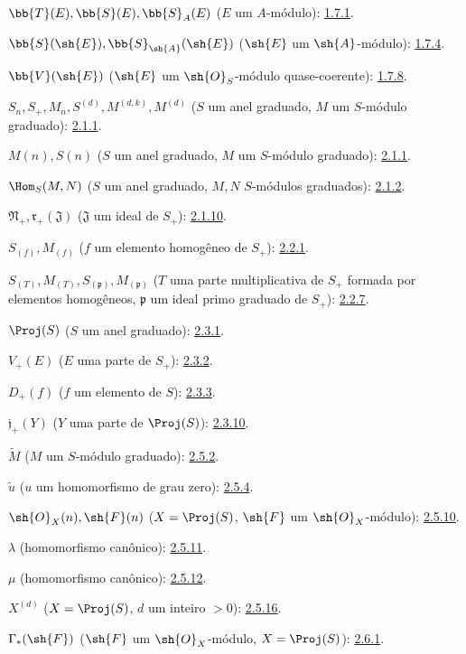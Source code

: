 \documentclass[oneside,10pt]{amsart}
\begin{document}
$\bb{T}(E),\bb{S}(E),\bb{S}_A(E)$ ($E$ um $A$-módulo): \hyperref[II.1.7.1]{1.7.1}.

$\bb{S}(\sh{E}),\bb{S}_{\sh{A}}(\sh{E})$
($\sh{E}$ um $\sh{A}$-módulo): \hyperref[II.1.7.4]{1.7.4}.

$\bb{V}(\sh{E})$ ($\sh{E}$ um $\sh{O}_S$-módulo quase-coerente): \hyperref[II.1.7.8]{1.7.8}.

$S_n,S_+,M_n,S^{(d)},M^{(d,k)},M^{(d)}$
($S$ um anel graduado, $M$ um $S$-módulo graduado): \hyperref[II.2.1.1]{2.1.1}.

$M(n),S(n)$ ($S$ um anel graduado, $M$ um $S$-módulo graduado): \hyperref[II.2.1.1]{2.1.1}.

$\Hom_S(M,N)$ ($S$ um anel graduado, $M,N$ $S$-módulos graduados): \hyperref[II.2.1.2]{2.1.2}.

$\mathfrak N_+,\mathfrak r_+(\mathfrak J)$
($\mathfrak J$ um ideal de $S_+$): \hyperref[II.2.1.10]{2.1.10}.

$S_{(f)},M_{(f)}$ ($f$ um elemento homogêneo de $S_+$): \hyperref[II.2.2.1]{2.2.1}.

$S_{(T)},M_{(T)},S_{(\mathfrak p)},M_{(\mathfrak p)}$
($T$ uma parte multiplicativa de $S_+$ formada por elementos homogêneos,
$\mathfrak p$ um ideal primo graduado de $S_+$): \hyperref[II.2.2.7]{2.2.7}.

$\Proj(S)$ ($S$ um anel graduado): \hyperref[II.2.3.1]{2.3.1}.

$V_+(E)$ ($E$ uma parte de $S_+$): \hyperref[II.2.3.2]{2.3.2}.

$D_+(f)$ ($f$ um elemento de $S$): \hyperref[II.2.3.3]{2.3.3}.

$\mathfrak j_+(Y)$ ($Y$ uma parte de $\Proj(S)$): \hyperref[II.2.3.10]{2.3.10}.

$\widetilde M$ ($M$ um $S$-módulo graduado): \hyperref[II.2.5.2]{2.5.2}.

$\widetilde u$ ($u$ um homomorfismo de grau zero): \hyperref[II.2.5.4]{2.5.4}.

$\sh{O}_X(n),\sh{F}(n)$
($X=\Proj(S)$, $\sh{F}$ um $\sh{O}_X$-módulo): \hyperref[II.2.5.10]{2.5.10}.

$\lambda$ (homomorfismo canônico): \hyperref[II.2.5.11]{2.5.11}.

$\mu$ (homomorfismo canônico): \hyperref[II.2.5.12]{2.5.12}.

$X^{(d)}$ ($X=\Proj(S)$, $d$ um inteiro $>0$): \hyperref[II.2.5.16]{2.5.16}.

$\Gamma_*(\sh{F})$ ($\sh{F}$ um $\sh{O}_X$-módulo,
$X=\Proj(S)$): \hyperref[II.2.6.1]{2.6.1}.
\end{document}
